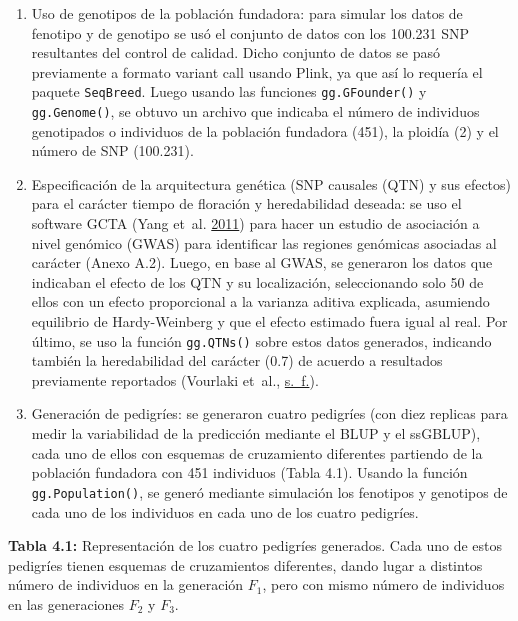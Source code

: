 \documentclass[11pt,spanish,a4paper,oneside,]{book} %
\begin{document}
\begin{enumerate}
\def\labelenumi{\arabic{enumi}.}
\item
  Uso de genotipos de la población fundadora: para simular los datos de fenotipo y de genotipo se usó el conjunto de datos con los 100.231 SNP resultantes del control de calidad. Dicho conjunto de datos se pasó previamente a formato variant call usando Plink, ya que así lo requería el paquete \texttt{SeqBreed}. Luego usando las funciones \texttt{gg.GFounder()} y \texttt{gg.Genome()}, se obtuvo un archivo que indicaba el número de individuos genotipados o individuos de la población fundadora (451), la ploidía (2) y el número de SNP (100.231).
\item
  Especificación de la arquitectura genética (SNP causales (QTN) y sus efectos) para el carácter tiempo de floración y heredabilidad deseada: se uso el software GCTA (Yang et~al. \protect\hyperlink{ref-cite:54}{2011}) para hacer un estudio de asociación a nivel genómico (GWAS) para identificar las regiones genómicas asociadas al carácter (Anexo A.2). Luego, en base al GWAS, se generaron los datos que indicaban el efecto de los QTN y su localización, seleccionando solo 50 de ellos con un efecto proporcional a la varianza aditiva explicada, asumiendo equilibrio de Hardy-Weinberg y que el efecto estimado fuera igual al real. Por último, se uso la función \texttt{gg.QTNs()} sobre estos datos generados, indicando también la heredabilidad del carácter (0.7) de acuerdo a resultados previamente reportados (Vourlaki et~al., \protect\hyperlink{ref-cite:26}{s.~f.}).
\item
  Generación de pedigríes: se generaron cuatro pedigríes (con diez replicas para medir la variabilidad de la predicción mediante el BLUP y el ssGBLUP), cada uno de ellos con esquemas de cruzamiento diferentes partiendo de la población fundadora con 451 individuos (Tabla 4.1). Usando la función \texttt{gg.Population()}, se generó mediante simulación los fenotipos y genotipos de cada uno de los individuos en cada uno de los cuatro pedigríes.
  \hspace*{1em}
\end{enumerate}

\noindent
\textbf{Tabla 4.1:} Representación de los cuatro pedigríes generados. Cada uno de estos pedigríes tienen esquemas de cruzamientos diferentes, dando lugar a distintos número de individuos en la generación \(F_{1}\), pero con mismo número de individuos en las generaciones \(F_{2}\) y \(F_{3}\).
\end{document}
